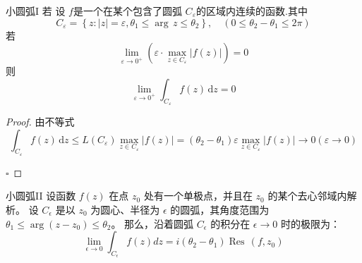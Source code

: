 \documentclass[../../复变函数.tex]{subfiles}
\begin{document}
\begin{lemma}{小圆弧I}
    若 设 \(  f  \)是一个在某个包含了圆弧 \(  C_{ \varepsilon }  \)的区域内连续的函数.其中 \[
    C_{ \varepsilon }= \left\{ z: \left| z \right|= \varepsilon ,  \theta _1 \le \operatorname{arg}\,z\le  \theta _2   \right\},\quad \left( 0\le  \theta _2 - \theta _1 \le 2\pi  \right) 
    \] 若 \[
    \lim_{ \varepsilon \to 0^{+ }}\left(  \varepsilon \cdot \max _{z\in C_{ \varepsilon }}\left| f\left( z \right)  \right|  \right)=  0
    \]则 \[
    \lim_{ \varepsilon \to 0^{+ }}\int_{C_{ \varepsilon }}f\left( z \right)\,\mathrm{d} z= 0 
    \]
\end{lemma}
\begin{proof}
    由不等式 \[
    \int_{C_{ \varepsilon }}f\left( z \right)\,\mathrm{d} z\le L\left( C_{ \varepsilon } \right)\max _{z \in C_{ \varepsilon }}\left| f\left( z \right)  \right|= \left(  \theta _2 - \theta _1  \right) \varepsilon \max _{z\in C_{ \varepsilon }}\left| f\left( z \right)  \right|\to 0\left(  \varepsilon \to 0 \right)      
    \]

    \hfill $\square$
\end{proof}


\begin{lemma}{小圆弧II}
    设函数 $f(z)$ 在点 $z_0$ 处有一个单极点，并且在 $z_0$ 的某个去心邻域内解析。
设 $C_\epsilon$ 是以 $z_0$ 为圆心、半径为 $\epsilon$ 的圆弧，其角度范围为 $\theta_1 \le \arg(z-z_0) \le \theta_2$。
那么，沿着圆弧 $C_\epsilon$ 的积分在 $\epsilon \to 0$ 时的极限为：
$$\lim_{\epsilon \to 0} \int_{C_\epsilon} f(z) dz = i (\theta_2 - \theta_1) \operatorname{Res}\,(f, z_0)$$
\end{lemma}
\end{document}
